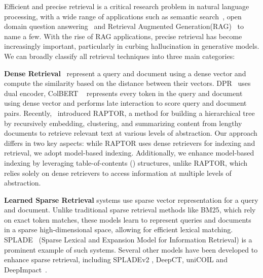 Efficient and precise retrieval is a critical research problem in natural language processing, with a wide range of applications such as semantic search~\cite{semantic_search}, open domain question answering~\cite{chen-yih-2020-open,zhu2021retrieving} and Retrieval Augmented Generation(RAG)~\cite{lewis2020retrieval} to name a few.
 With the rise of RAG applications, precise retrieval has become increasingly important, particularly in curbing  hallucination in generative models.  We can broadly classify all retrieval techniques into three main categories:

\textbf{Dense Retrieval}~\cite{Cai2021SemanticMF,Karpukhin2020DensePR} represent a query and document using a dense vector and compute the similarity based on the distance between their vectors. DPR~\cite{Karpukhin2020DensePR} uses dual encoder, ColBERT ~\cite{Khattab2020ColBERTEA} represents every token in the query and document using dense vector and performs late interaction to score query and document pairs. Recently,~\citet{sarthi2024raptor} introduced RAPTOR, a method for building a hierarchical tree by recursively embedding, clustering, and summarizing content from lengthy documents to retrieve relevant text at various levels of abstraction. Our approach differs in two key aspects: while RAPTOR uses dense retrievers for indexing and retrieval, we adopt model-based indexing. Additionally, we enhance model-based indexing by leveraging table-of-contents ({\toc}) structures, unlike RAPTOR, which relies solely on dense retrievers to access information at multiple levels of abstraction.

\textbf{Learned Sparse Retrieval} systems use sparse vector representation for a query and document. Unlike traditional sparse retrieval methods like BM25\cite{robertson2009probabilistic}, which rely on exact token matches, these models learn to represent queries and documents in a sparse high-dimensional space, allowing for efficient lexical matching. SPLADE~\cite{Hai2023CoSPLADECS} (Sparse Lexical and Expansion Model for Information Retrieval) is a prominent example of such systems. Several other models have been developed to enhance sparse retrieval, including SPLADEv2 \cite{formal2021splade}, DeepCT\cite{dai2019context}, uniCOIL\cite{lin2021few} and DeepImpact~\cite{basnet2024deeperimpact}.

